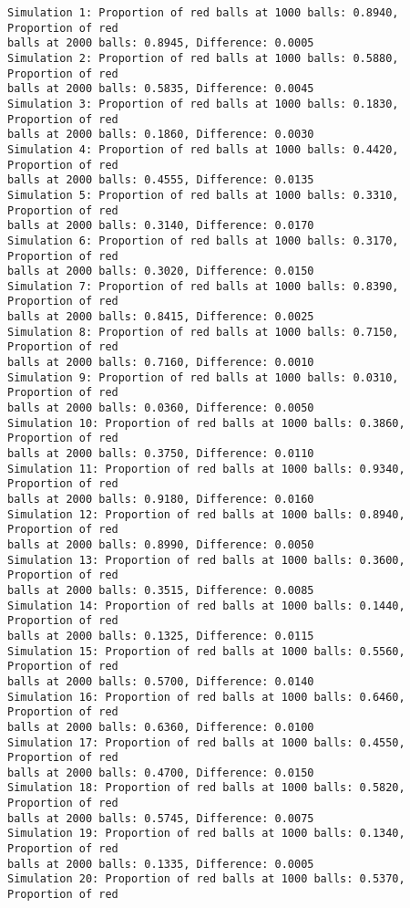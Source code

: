 \documentclass[11pt]{article}
\begin{document}
    \begin{Verbatim}[commandchars=\\\{\}]
Simulation 1: Proportion of red balls at 1000 balls: 0.8940, Proportion of red
balls at 2000 balls: 0.8945, Difference: 0.0005
Simulation 2: Proportion of red balls at 1000 balls: 0.5880, Proportion of red
balls at 2000 balls: 0.5835, Difference: 0.0045
Simulation 3: Proportion of red balls at 1000 balls: 0.1830, Proportion of red
balls at 2000 balls: 0.1860, Difference: 0.0030
Simulation 4: Proportion of red balls at 1000 balls: 0.4420, Proportion of red
balls at 2000 balls: 0.4555, Difference: 0.0135
Simulation 5: Proportion of red balls at 1000 balls: 0.3310, Proportion of red
balls at 2000 balls: 0.3140, Difference: 0.0170
Simulation 6: Proportion of red balls at 1000 balls: 0.3170, Proportion of red
balls at 2000 balls: 0.3020, Difference: 0.0150
Simulation 7: Proportion of red balls at 1000 balls: 0.8390, Proportion of red
balls at 2000 balls: 0.8415, Difference: 0.0025
Simulation 8: Proportion of red balls at 1000 balls: 0.7150, Proportion of red
balls at 2000 balls: 0.7160, Difference: 0.0010
Simulation 9: Proportion of red balls at 1000 balls: 0.0310, Proportion of red
balls at 2000 balls: 0.0360, Difference: 0.0050
Simulation 10: Proportion of red balls at 1000 balls: 0.3860, Proportion of red
balls at 2000 balls: 0.3750, Difference: 0.0110
Simulation 11: Proportion of red balls at 1000 balls: 0.9340, Proportion of red
balls at 2000 balls: 0.9180, Difference: 0.0160
Simulation 12: Proportion of red balls at 1000 balls: 0.8940, Proportion of red
balls at 2000 balls: 0.8990, Difference: 0.0050
Simulation 13: Proportion of red balls at 1000 balls: 0.3600, Proportion of red
balls at 2000 balls: 0.3515, Difference: 0.0085
Simulation 14: Proportion of red balls at 1000 balls: 0.1440, Proportion of red
balls at 2000 balls: 0.1325, Difference: 0.0115
Simulation 15: Proportion of red balls at 1000 balls: 0.5560, Proportion of red
balls at 2000 balls: 0.5700, Difference: 0.0140
Simulation 16: Proportion of red balls at 1000 balls: 0.6460, Proportion of red
balls at 2000 balls: 0.6360, Difference: 0.0100
Simulation 17: Proportion of red balls at 1000 balls: 0.4550, Proportion of red
balls at 2000 balls: 0.4700, Difference: 0.0150
Simulation 18: Proportion of red balls at 1000 balls: 0.5820, Proportion of red
balls at 2000 balls: 0.5745, Difference: 0.0075
Simulation 19: Proportion of red balls at 1000 balls: 0.1340, Proportion of red
balls at 2000 balls: 0.1335, Difference: 0.0005
Simulation 20: Proportion of red balls at 1000 balls: 0.5370, Proportion of red

\end{Verbatim}
\end{document}
